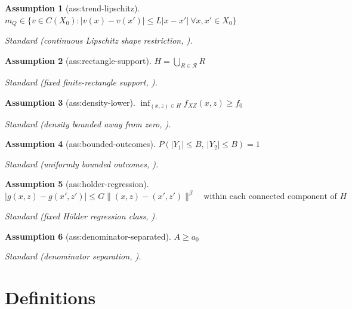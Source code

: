 \documentclass{article}
\newtheorem{assumption}{Assumption}
\begin{document}
\begin{assumption}[ass:trend-lipschitz]\label{ass:trend-lipschitz}
\(m_Q\in\{v\in C(X_0):|v(x)-v(x')|\le L|x-x'|\ \forall x,x'\in X_0\}\)
\par\smallskip\noindent\emph{Standard} (continuous Lipschitz shape restriction, \cite{ArmstrongKolesar2018OptimalInference}).
\end{assumption}

\begin{assumption}[ass:rectangle-support]\label{ass:rectangle-support}
\(H=\bigcup_{R\in\mathscr R}R\)
\par\smallskip\noindent\emph{Standard} (fixed finite-rectangle support, \cite{CattaneoChandakJanssonMa2024BoundaryConditionalDensity}).
\end{assumption}

\begin{assumption}[ass:density-lower]\label{ass:density-lower}
\(\inf_{(x,z)\in H}f_{XZ}(x,z)\ge f_0\)
\par\smallskip\noindent\emph{Standard} (density bounded away from zero, \cite{CattaneoChandakJanssonMa2024BoundaryConditionalDensity}).
\end{assumption}

\begin{assumption}[ass:bounded-outcomes]\label{ass:bounded-outcomes}
\(P(|Y_1|\le B,\ |Y_2|\le B)=1\)
\par\smallskip\noindent\emph{Standard} (uniformly bounded outcomes, \cite{KaidoMolinariStoye2019CalibratedProjection}).
\end{assumption}

\begin{assumption}[ass:holder-regression]\label{ass:holder-regression}
\(|g(x,z)-g(x',z')|\le G\|(x,z)-(x',z')\|^\beta\quad\text{within each connected component of }H\)
\par\smallskip\noindent\emph{Standard} (fixed Hölder regression class, \cite{BelloniChernozhukovChetverikovKato2015Series}).
\end{assumption}

\begin{assumption}[ass:denominator-separated]\label{ass:denominator-separated}
\(A\ge a_0\)
\par\smallskip\noindent\emph{Standard} (denominator separation, \cite{GrahamPowell2012IrregularCRC}).
\end{assumption}

\section{Definitions}
\end{document}
